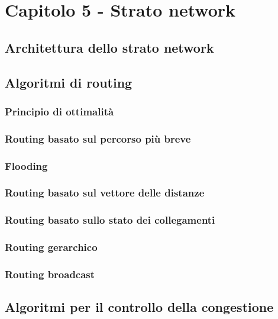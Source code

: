 \newpage
\section{Capitolo 5 - Strato network}

\subsection{Architettura dello strato network}

\subsection{Algoritmi di routing} %

\subsubsection{Principio di ottimalità}

\subsubsection{Routing basato sul percorso più breve}

\subsubsection{Flooding}

\subsubsection{Routing basato sul vettore delle distanze}

\subsubsection{Routing basato sullo stato dei collegamenti} %

\subsubsection{Routing gerarchico}

\subsubsection{Routing broadcast}

\subsection{Algoritmi per il controllo della congestione} 

